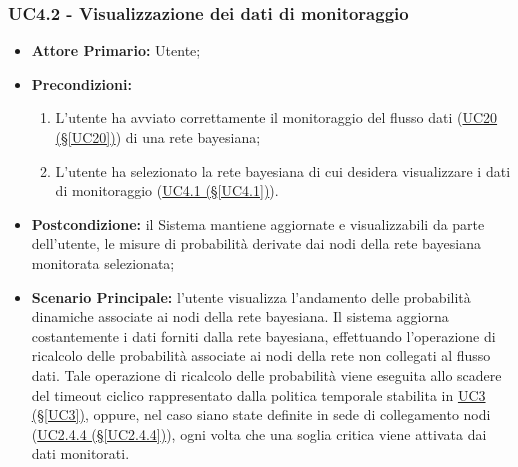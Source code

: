\subsubsection{UC4.2 - Visualizzazione dei dati di monitoraggio}\label{UC4.2}

\begin{itemize}
	\item \textbf{Attore Primario:} Utente;
	\item \textbf{Precondizioni:}
	\begin{enumerate}
 		\item L'utente ha avviato correttamente il monitoraggio del flusso dati (\hyperref[UC20]{UC20 (§\ref*{UC20})}) di una rete bayesiana;
 		\item L'utente ha selezionato la rete bayesiana di cui desidera visualizzare i dati di monitoraggio (\hyperref[UC4.1]{UC4.1 (§\ref*{UC4.1})}).
	\end{enumerate}
	\item \textbf{Postcondizione:} il Sistema mantiene aggiornate e visualizzabili da parte dell'utente, le misure di probabilità derivate dai nodi della rete bayesiana monitorata selezionata;
	\item \textbf{Scenario Principale:} l'utente visualizza l'andamento delle probabilità dinamiche associate ai nodi della rete bayesiana. Il sistema aggiorna costantemente i dati forniti dalla rete bayesiana, effettuando l'operazione di ricalcolo delle probabilità associate ai nodi della rete non collegati al flusso dati. Tale operazione di ricalcolo delle probabilità viene eseguita allo scadere del timeout ciclico rappresentato dalla politica temporale stabilita in \hyperref[UC3]{UC3 (§\ref*{UC3})}, oppure, nel caso siano state definite in sede di collegamento nodi (\hyperref[UC2.4.4]{UC2.4.4 (§\ref*{UC2.4.4})}), ogni volta che una soglia critica viene attivata dai dati monitorati.
\end{itemize}

\pagebreak

